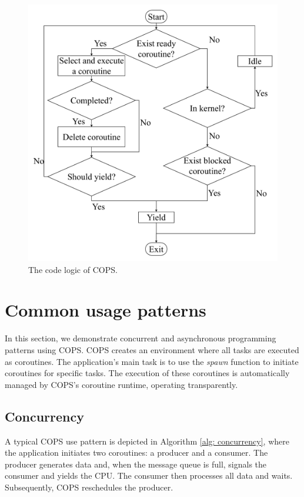 \documentclass[conference]{IEEEtran}
\begin{document}
\begin{figure}[tbp]
  \centering
  \includegraphics[width=\linewidth]{assets/flow.pdf}
  \caption{The code logic of COPS.}
  \label{fig:flow}
  \vspace{-1em}
\end{figure}

\section{Common usage patterns}
\label{section: Common usage patterns}

In this section, we demonstrate concurrent and asynchronous programming patterns using COPS. COPS creates an environment where all tasks are executed as coroutines. The application's main task is to use the \textit{spawn} function to initiate coroutines for specific tasks. The execution of these coroutines is automatically managed by COPS's coroutine runtime, operating transparently.

\subsection{Concurrency}

A typical COPS use pattern is depicted in Algorithm \ref{alg: concurrency}, where the application initiates two coroutines: a producer and a consumer. The producer generates data and, when the message queue is full, signals the consumer and yields the CPU. The consumer then processes all data and waits. Subsequently, COPS reschedules the producer.
\end{document}
